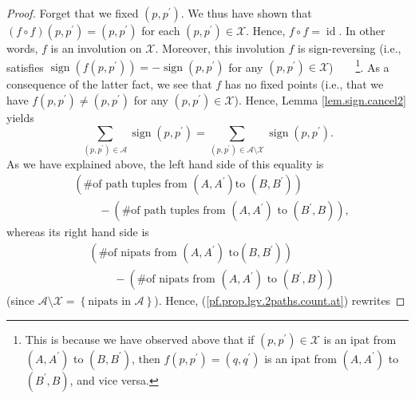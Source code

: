 \begin{definition}
\begin{proof}
Forget that we fixed $\left(  p,p^{\prime}\right)  $. We thus have shown that
$\left(  f\circ f\right)  \left(  p,p^{\prime}\right)  =\left(  p,p^{\prime
}\right)  $ for each $\left(  p,p^{\prime}\right)  \in\mathcal{X}$. Hence,
$f\circ f=\operatorname*{id}$. In other words, $f$ is an involution on
$\mathcal{X}$. Moreover, this involution $f$ is sign-reversing (i.e.,
satisfies $\operatorname*{sign}\left(  f\left(  p,p^{\prime}\right)  \right)
=-\operatorname*{sign}\left(  p,p^{\prime}\right)  $ for any $\left(
p,p^{\prime}\right)  \in\mathcal{X}$)\ \ \ \ \footnote{This is because we have
observed above that if $\left(  p,p^{\prime}\right)  \in\mathcal{X}$ is an
ipat from $\left(  A,A^{\prime}\right)  $ to $\left(  B,B^{\prime}\right)  $,
then $f\left(  p,p^{\prime}\right)  =\left(  q,q^{\prime}\right)  $ is an ipat
from $\left(  A,A^{\prime}\right)  $ to $\left(  B^{\prime},B\right)  $, and
vice versa.}. As a consequence of the latter fact, we see that $f$ has no
fixed points (i.e., that we have $f\left(  p,p^{\prime}\right)  \neq\left(
p,p^{\prime}\right)  $ for any $\left(  p,p^{\prime}\right)  \in\mathcal{X}$).
Hence, Lemma \ref{lem.sign.cancel2} yields%
\begin{equation}
\sum_{\left(  p,p^{\prime}\right)  \in\mathcal{A}}\operatorname*{sign}\left(
p,p^{\prime}\right)  =\sum_{\left(  p,p^{\prime}\right)  \in\mathcal{A}%
\setminus\mathcal{X}}\operatorname*{sign}\left(  p,p^{\prime}\right)  .
\label{pf.prop.lgv.2paths.count.at}%
\end{equation}
As we have explained above, the left hand side of this equality is%
\begin{align*}
&  \left(  \text{\# of path tuples from }\left(  A,A^{\prime}\right)  \text{
to }\left(  B,B^{\prime}\right)  \right) \\
&  \ \ \ \ \ \ \ \ \ \ -\left(  \text{\# of path tuples from }\left(
A,A^{\prime}\right)  \text{ to }\left(  B^{\prime},B\right)  \right)  ,
\end{align*}
whereas its right hand side is%
\begin{align*}
&  \left(  \text{\# of nipats from }\left(  A,A^{\prime}\right)  \text{ to
}\left(  B,B^{\prime}\right)  \right) \\
&  \ \ \ \ \ \ \ \ \ \ -\left(  \text{\# of nipats from }\left(  A,A^{\prime
}\right)  \text{ to }\left(  B^{\prime},B\right)  \right)
\end{align*}
(since $\mathcal{A}\setminus\mathcal{X}=\left\{  \text{nipats in }%
\mathcal{A}\right\}  $). Hence, (\ref{pf.prop.lgv.2paths.count.at}) rewrites

\end{proof}
\end{definition}
